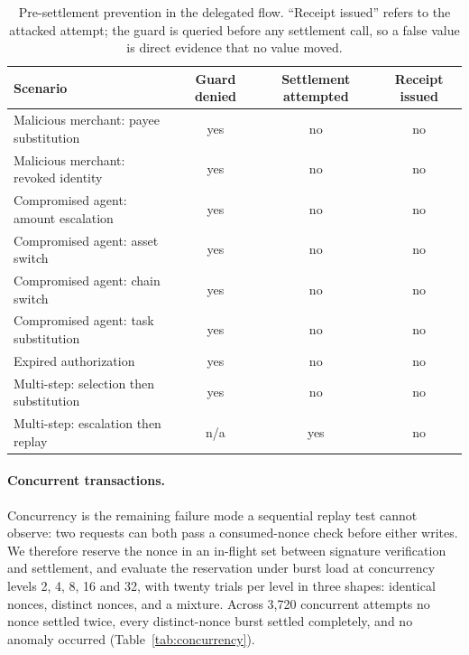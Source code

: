 \begin{table}[t]
\centering
\small
\caption{Pre-settlement prevention in the delegated flow. ``Receipt issued''
refers to the attacked attempt; the guard is queried before any settlement call,
so a false value is direct evidence that no value moved.}
\label{tab:presettlement}
\begin{tabular}{@{}lccc@{}}
\toprule
Scenario & Guard denied & Settlement attempted & Receipt issued \\
\midrule
Malicious merchant: payee substitution      & yes & no & no \\
Malicious merchant: revoked identity        & yes & no & no \\
Compromised agent: amount escalation        & yes & no & no \\
Compromised agent: asset switch             & yes & no & no \\
Compromised agent: chain switch             & yes & no & no \\
Compromised agent: task substitution        & yes & no & no \\
Expired authorization                       & yes & no & no \\
Multi-step: selection then substitution     & yes & no & no \\
Multi-step: escalation then replay          & n/a & yes & no \\
\bottomrule
\end{tabular}
\end{table}

\paragraph{Concurrent transactions.}
Concurrency is the remaining failure mode a sequential replay test cannot
observe: two requests can both pass a consumed-nonce check before either writes.
We therefore reserve the nonce in an in-flight set between signature
verification and settlement, and evaluate the reservation under burst load at
concurrency levels 2, 4, 8, 16 and 32, with twenty trials per level in three
shapes: identical nonces, distinct nonces, and a mixture. Across 3{,}720
concurrent attempts no nonce settled twice, every distinct-nonce burst settled
completely, and no anomaly occurred (Table~\ref{tab:concurrency}).

